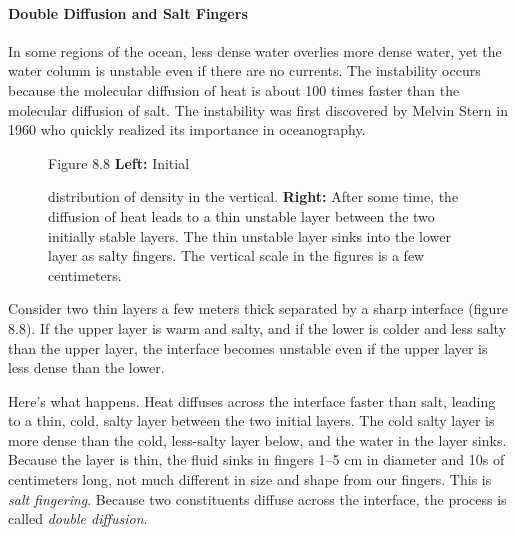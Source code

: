 \paragraph{Double Diffusion and Salt Fingers}
In some regions of the ocean,
less dense water overlies more dense water, yet the water column is
unstable even if there are no currents. The instability occurs because
the molecular diffusion of heat is about 100 times faster than the
molecular diffusion of salt. The instability was first discovered by
Melvin Stern in 1960 who quickly realized its importance in
oceanography.

\begin{figure}[h!]
\footnotesize
Figure 8.8 \textbf{Left:} Initial \rule{0mm}{4ex}distribution of
density in the vertical. \textbf{Right:} After some time, the
diffusion of heat leads to a thin unstable layer between the two
initially stable layers. The thin unstable layer sinks into the lower
layer as salty fingers. The vertical scale in the figures is a few
centimeters.
\label{fig:saltfingers}
\vspace{-2ex}
\end{figure}

Consider two thin layers a few meters thick separated by a sharp
interface (figure 8.8). If the upper layer is warm and salty, and if
the lower is colder and less salty than the upper layer, the interface
becomes unstable even if the upper layer is less dense than the lower.

Here's what happens. Heat diffuses across the interface faster than
salt, leading to a thin, cold, salty layer between the two initial
layers. The cold salty layer is more dense than the cold, less-salty
layer below, and the water in the layer sinks. Because the layer is
thin, the fluid sinks in fingers 1--5 cm in diameter and 10s of
centimeters long, not much different in size and shape from our
fingers. This is \textit{salt fingering}. Because two constituents diffuse across the
interface, the process is called \textit{double
  diffusion}.

